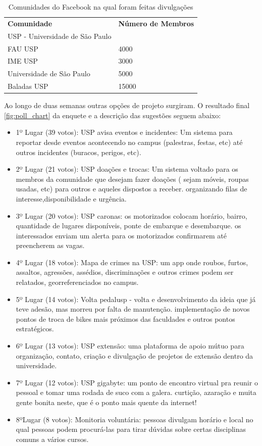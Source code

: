 \begin{table}[]
\centering
\caption{Comunidades do Facebook na qual foram feitas divulgações}
\label{my-label}
\begin{tabular}{ll}
{\color[HTML]{3531FF} \textbf{Comunidade}} & {\color[HTML]{3531FF} \textbf{Número de Membros}} \\
USP - Universidade de São Paulo            &                                                   \\
FAU USP                                    & 4000                                              \\
IME USP                                    & 3000                                              \\
Universidade de São Paulo                  & 5000                                              \\
Baladas USP                                & 15000
\end{tabular}
\end{table}
\par Ao longo de duas semanas outras opções de projeto surgiram. O resultado final \ref{fig:poll_chart} da enquete e a descrição das sugestões seguem abaixo:
\begin{itemize}
\item{ 1º Lugar (39 votos):} USP avisa eventos e incidentes: Um sistema para reportar desde eventos acontecendo no campus (palestras, festas, etc) até outros incidentes (buracos, perigos, etc).
\item {2º Lugar (21 votos):} USP doações e trocas: Um sistema voltado para os membros da comunidade que desejam fazer doações ( sejam móveis, roupas usadas, etc) para outros e aqueles dispostos a receber. organizando filas de interesse,disponibilidade e urgência.
\item {3º Lugar (20 votos):} USP caronas: os motorizados colocam horário, bairro, quantidade de lugares disponíveis, ponte de embarque e desembarque. os interessados enviam um alerta para os motorizados confirmarem até preencherem as vagas.
\item {4º Lugar (18 votos):} Mapa de crimes na USP: um app onde roubos, furtos, assaltos, agressões, assédios, discriminações e outros crimes podem ser relatados, georreferenciados no campus.
\item {5º Lugar (14 votos):} Volta pedalusp - volta e desenvolvimento da ideia que já teve adesão, mas morreu por falta de manutenção. implementação de novos pontos de troca de bikes mais próximos das faculdades e outros pontos estratégicos.
\item {6º Lugar (13 votos): } USP extensão: uma plataforma de apoio mútuo para organização, contato, criação e divulgação de projetos de extensão dentro da universidade.
\item {7º Lugar (12 votos):} USP gigabyte: um ponto de encontro virtual pra reunir o pessoal e tomar uma rodada de suco com a galera. curtição, azaração e muita gente bonita neste, que é o ponto mais quente da internet!
\item {8ºLugar (8 votos):} Monitoria voluntária: pessoas divulgam horário e local no qual pessoas podem procurá-las para tirar dúvidas sobre certas disciplinas comuns a vários cursos.
\end{itemize}

